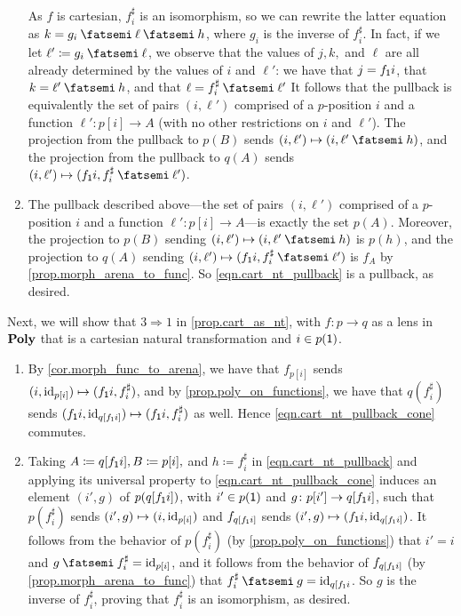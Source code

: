 \documentclass[Book-Poly]{subfiles}
\begin{document}
\begin{exercise}
\begin{solution}
\begin{enumerate}
    As $f$ is cartesian, $f^\sharp_i$ is an isomorphism, so we can rewrite the latter equation as $k=g_i\then\ell\then h$, where $g_i$ is the inverse of $f^\sharp_i$.
    In fact, if we let $\ell'\coloneqq g_i\then\ell$, we observe that the values of $j,k,$ and $\ell$ are all already determined by the values of $i$ and $\ell'$: we have that $j=f_{\textsf{1}}i$, that $k=\ell'\then h$, and that $\ell=f^\sharp_i\then\ell'$
    It follows that the pullback is equivalently the set of pairs $(i,\ell')$ comprised of a $p$-position $i$ and a function $\ell'\colon p[i]\to A$ (with no other restrictions on $i$ and $\ell'$).
    The projection from the pullback to $p(B)$ sends $(i,\ell')\mapsto(i,\ell'\then h)$, and the projection from the pullback to $q(A)$ sends $(i,\ell')\mapsto(f_\1i,f^\sharp_i\then\ell')$.
    \item The pullback described above---the set of pairs $(i,\ell')$ comprised of a $p$-position $i$ and a function $\ell'\colon p[i]\to A$---is exactly the set $p(A)$.
    Moreover, the projection to $p(B)$ sending $(i,\ell')\mapsto(i,\ell'\then h)$ is $p(h)$, and the projection to $q(A)$ sending $(i,\ell')\mapsto(f_\1i,f^\sharp_i\then\ell')$ is $f_A$ by \cref{prop.morph_arena_to_func}.
    So \eqref{eqn.cart_nt_pullback} is a pullback, as desired.
\end{enumerate}
Next, we will show that $3\Rightarrow1$ in \cref{prop.cart_as_nt}, with $f\colon p\to q$ as a lens in $\mathbf{Poly}$ that is a cartesian natural transformation and $i\in p(\textsf{1})$.
\begin{enumerate}[resume]
    \item By \cref{cor.morph_func_to_arena}, we have that $f_{p[i]}$ sends $(i,\mathrm{id}_{p[i]})\mapsto(f_{\textsf{1}}i,f^\sharp_i)$, and by \cref{prop.poly_on_functions}, we have that $q(f^\sharp_i)$ sends $(f_{\textsf{1}}i,\mathrm{id}_{q[f_{\textsf{1}}i]})\mapsto(f_{\textsf{1}}i,f^\sharp_i)$ as well.
    Hence \eqref{eqn.cart_nt_pullback_cone} commutes.

    \item Taking $A\coloneqq q[f_{\textsf{1}}i], B\coloneqq p[i],$ and $h\coloneqq f^\sharp_i$ in \eqref{eqn.cart_nt_pullback} and applying its universal property to \eqref{eqn.cart_nt_pullback_cone} induces an element $(i',g)$ of $p(q[f_{\textsf{1}}i])$, with $i'\in p(\textsf{1})$ and $g\colon p[i']\to q[f_{\textsf{1}}i]$, such that $p(f^\sharp_i)$ sends $(i',g)\mapsto(i,\mathrm{id}_{p[i]})$ and $f_{q[f_{\textsf{1}}i]}$ sends $(i',g)\mapsto(f_{\textsf{1}}i,\mathrm{id}_{q[f_{\textsf{1}}i]})$.
    It follows from the behavior of $p(f^\sharp_i)$ (by \cref{prop.poly_on_functions}) that $i'=i$ and $g\then f^\sharp_i=\id_{p[i]}$, and it follows from the behavior of $f_{q[f_{\textsf{1}}i]}$ (by \cref{prop.morph_arena_to_func}) that $f^\sharp_i\then g=\id_{q[f_\1i}$.
    So $g$ is the inverse of $f^\sharp_i$, proving that $f^\sharp_i$ is an isomorphism, as desired.
\end{enumerate}
\end{solution}
\end{exercise}
\end{document}
